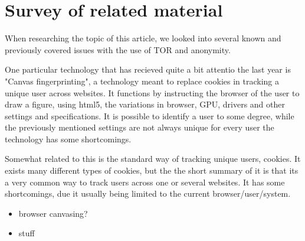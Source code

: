 \section{Survey of related material}
\label{sec:related}
When researching the topic of this article, we looked into several known and previously covered issues with the use of TOR and anonymity.

One particular technology that has recieved quite a bit attentio the last year is "Canvas fingerprinting", a technology meant to replace cookies in tracking a unique user across websites. It functions by instructing the browser of the user to draw a figure, using html5, the variations in browser, GPU, drivers and other settings and specifications. It is possible to identify a user to some degree, while the previously mentioned settings are not always unique for every user the technology has some shortcomings.~\cite{wiki_canvas}

Somewhat related to this is the standard way of tracking unique users, cookies.
It exists many different types of cookies, but the the short summary of it is that its a very common way to track users across one or several websites. It has some shortcomings, due it usually being limited to the current browser/user/system.~\cite{wiki_cookie}




\begin{itemize}
\item browser canvasing?
\item stuff
\end{itemize}